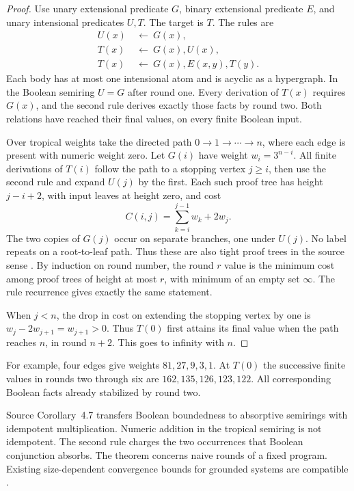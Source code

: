 \documentclass[11pt]{amsart}
\begin{document}
\begin{proof}
Use unary extensional predicate \(G\), binary extensional
predicate \(E\), and unary intensional predicates \(U,T\).
The target is \(T\). The rules are
\[
\begin{aligned}
 U(x)&\ \leftarrow\ G(x),\\
 T(x)&\ \leftarrow\ G(x),U(x),\\
 T(x)&\ \leftarrow\ G(x),E(x,y),T(y).
\end{aligned}
\]
Each body has at most one intensional atom and is acyclic as a
hypergraph. In the Boolean semiring \(U=G\) after round one.
Every derivation of \(T(x)\) requires \(G(x)\), and the second
rule derives exactly those facts by round two. Both relations
have reached their final values, on every finite Boolean input.

Over tropical weights take the directed path \(0\to1\to
\cdots\to n\), where each edge is present with numeric weight
zero. Let \(G(i)\) have weight \(w_i=3^{n-i}\). All finite
derivations of \(T(i)\) follow the path to a stopping vertex
\(j\ge i\), then use the second rule and expand \(U(j)\) by the
first. Each such proof tree has height \(j-i+2\), with input
leaves at height zero, and cost
\[
       C(i,j)=\sum_{k=i}^{j-1}w_k+2w_j .
\]
The two copies of \(G(j)\) occur on separate branches, one under
\(U(j)\). No label repeats on a root-to-leaf path. Thus these
are also tight proof trees in the source sense
\cite[Sec.~2.4]{fkr}. By induction on round number, the round
\(r\) value is the minimum cost among proof trees of height
at most \(r\), with minimum of an empty set \(\infty\).
The rule recurrence gives exactly the same statement.

When \(j<n\), the drop in cost on extending the stopping vertex
by one is \(w_j-2w_{j+1}=w_{j+1}>0\). Thus \(T(0)\) first
attains its final value when the path reaches \(n\), in round
\(n+2\). This goes to infinity with \(n\).
\end{proof}

For example, four edges give weights \(81,27,9,3,1\). At
\(T(0)\) the successive finite values in rounds two through
six are \(162,135,126,123,122\). All corresponding Boolean
facts already stabilized by round two.

Source Corollary~4.7 transfers Boolean boundedness to absorptive
semirings with idempotent multiplication. Numeric addition in
the tropical semiring is not idempotent. The second rule
charges the two occurrences that Boolean conjunction absorbs.
The theorem concerns naive rounds of a fixed program. Existing
size-dependent convergence bounds for grounded systems are
compatible \cite{frisk}.
\end{document}
